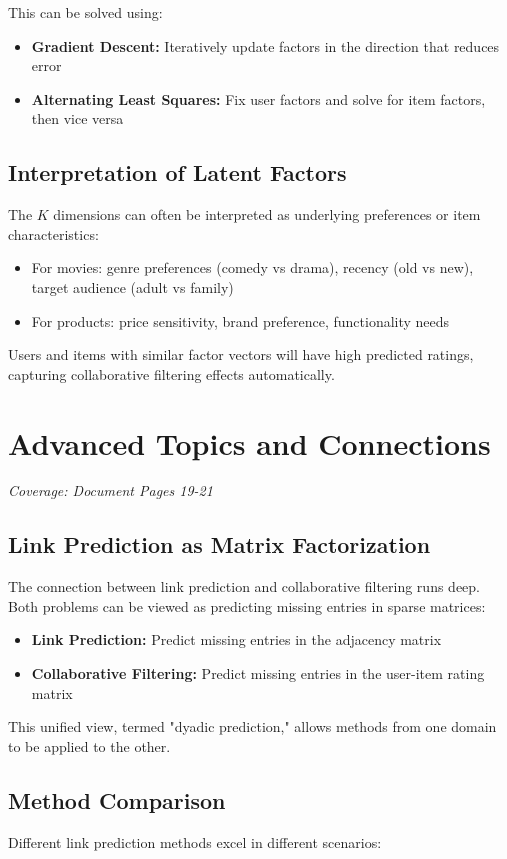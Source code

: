 \documentclass[11pt,a4paper]{article}
\begin{document}
This can be solved using:
\begin{itemize}
\item \textbf{Gradient Descent:} Iteratively update factors in the direction that reduces error
\item \textbf{Alternating Least Squares:} Fix user factors and solve for item factors, then vice versa
\end{itemize}

\subsection{Interpretation of Latent Factors}
The $K$ dimensions can often be interpreted as underlying preferences or item characteristics:
\begin{itemize}
\item For movies: genre preferences (comedy vs drama), recency (old vs new), target audience (adult vs family)
\item For products: price sensitivity, brand preference, functionality needs
\end{itemize}

Users and items with similar factor vectors will have high predicted ratings, capturing collaborative filtering effects automatically.

\section{Advanced Topics and Connections}
\textit{Coverage: Document Pages 19-21}

\subsection{Link Prediction as Matrix Factorization}
The connection between link prediction and collaborative filtering runs deep. Both problems can be viewed as predicting missing entries in sparse matrices:

\begin{itemize}
\item \textbf{Link Prediction:} Predict missing entries in the adjacency matrix
\item \textbf{Collaborative Filtering:} Predict missing entries in the user-item rating matrix
\end{itemize}

This unified view, termed "dyadic prediction," allows methods from one domain to be applied to the other.

\subsection{Method Comparison}
Different link prediction methods excel in different scenarios:
\end{document}
